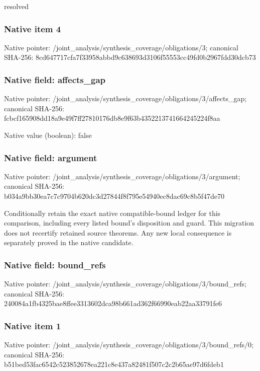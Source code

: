 \documentclass[10pt,a4paper]{article}
\begin{document}
\begingroup\raggedright\sloppy resolved\par\endgroup

\subsubsection{Native item 4}
Native pointer: /joint\_\allowbreak{}analysis/synthesis\_\allowbreak{}coverage/obligations/3; canonical SHA-256: 8cd647717cfa7f33958abbd9c638693d3106f55553cc49fd0b2967fdd30dcb73

\subsubsection{Native field: affects\_\allowbreak{}gap}
Native pointer: /joint\_\allowbreak{}analysis/synthesis\_\allowbreak{}coverage/obligations/3/affects\_\allowbreak{}gap; canonical SHA-256: fcbcf165908dd18a9e49f7ff27810176db8e9f63b4352213741664245224f8aa

Native value (boolean): false

\subsubsection{Native field: argument}
Native pointer: /joint\_\allowbreak{}analysis/synthesis\_\allowbreak{}coverage/obligations/3/argument; canonical SHA-256: b034a9bb30ea7c7c9704b620dc3d27844f8f795e54940ec8dac69c8b5f47de70

\begingroup\raggedright\sloppy Conditionally retain the exact native compatible-bound ledger for this comparison,\allowbreak{} including every listed bound's disposition and guard. This migration does not recertify retained source theorems. Any new local consequence is separately proved in the native candidate.\par\endgroup

\subsubsection{Native field: bound\_\allowbreak{}refs}
Native pointer: /joint\_\allowbreak{}analysis/synthesis\_\allowbreak{}coverage/obligations/3/bound\_\allowbreak{}refs; canonical SHA-256: 240084a1fb4325bae8ffee3313602dca98b661ad362f66990eab22aa33791fe6

\subsubsection{Native item 1}
Native pointer: /joint\_\allowbreak{}analysis/synthesis\_\allowbreak{}coverage/obligations/3/bound\_\allowbreak{}refs/0; canonical SHA-256: b51bed53fac6542c523852678ea221c8e437a82481f507c2c2b65ae97d6fdeb1
\end{document}
